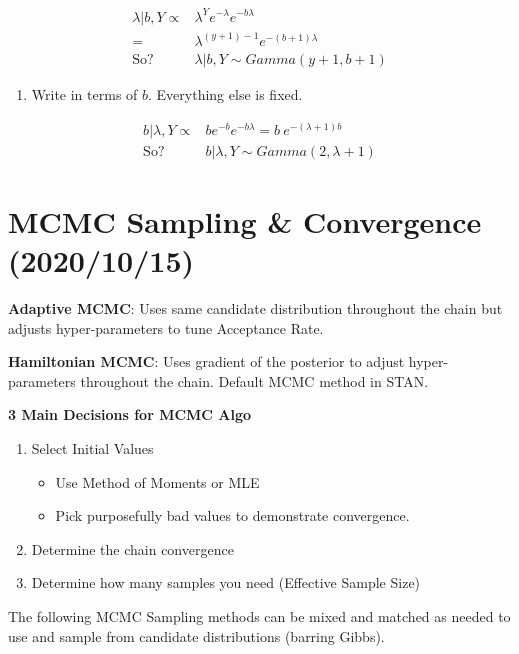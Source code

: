 \documentclass[11pt]{article}
\begin{document}
\begin{enumerate}
\begin{equation}
\begin{split}
\lambda | b, Y \propto & \lambda^Y e^{- \lambda} e ^{- b \lambda}\\
= & \lambda^{(y + 1) - 1} e^{-(b + 1) \lambda}\\
\text{So?} \ & \lambda | b, Y \sim Gamma(y+ 1, b + 1)
\end{split}
\end{equation}

\begin{enumerate}
\item Write in terms of \(b\). Everything else is fixed.
\end{enumerate}

\begin{equation}
\begin{split}
b | \lambda, Y \propto & b e^{-b} e^{-b \lambda} = b \ e^{-(\lambda + 1)b}\\
\text{So?} \ & b | \lambda, Y \sim Gamma(2, \lambda + 1)
\end{split}
\end{equation}
\end{enumerate}
\section{MCMC Sampling \& Convergence (2020/10/15)}
\label{sec:org77bfb59}


\textbf{Adaptive MCMC}: Uses same candidate distribution throughout the chain but
adjusts hyper-parameters to tune Acceptance Rate.

\textbf{Hamiltonian MCMC}: Uses gradient of the posterior to adjust hyper-parameters
throughout the chain. Default MCMC method in STAN.

\textbf{3 Main Decisions for MCMC Algo}
\begin{enumerate}
\item Select Initial Values
\begin{itemize}
\item Use Method of Moments or MLE
\item Pick purposefully bad values to demonstrate convergence.
\end{itemize}
\item Determine the chain convergence
\item Determine how many samples you need (Effective Sample Size)
\end{enumerate}

The following MCMC Sampling methods can be mixed and matched as needed to use
and sample from candidate distributions (barring Gibbs).
\end{document}
